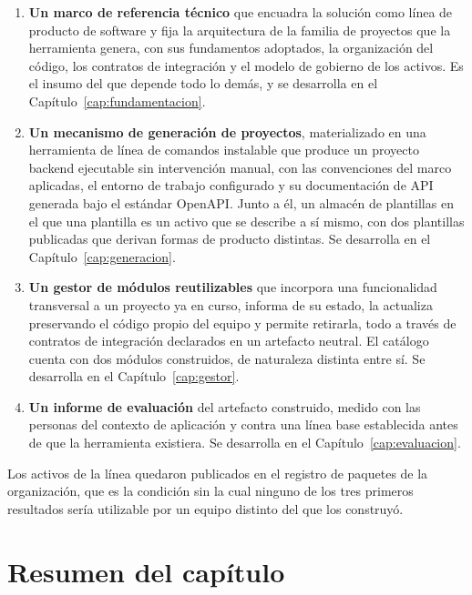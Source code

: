 \begin{enumerate}
\item \textbf{Un marco de referencia técnico} que encuadra la solución como
línea de producto de software y fija la arquitectura de la familia de
proyectos que la herramienta genera, con sus fundamentos adoptados, la
organización del código, los contratos de integración y el modelo de
gobierno de los activos. Es el insumo del que depende todo lo demás, y se
desarrolla en el Capítulo~\ref{cap:fundamentacion}.

\item \textbf{Un mecanismo de generación de proyectos}, materializado en una
herramienta de línea de comandos instalable que produce un proyecto backend
ejecutable sin intervención manual, con las convenciones del marco aplicadas,
el entorno de trabajo configurado y su documentación de API generada bajo el
estándar OpenAPI. Junto a él, un almacén de plantillas en el que una
plantilla es un activo que se describe a sí mismo, con dos plantillas
publicadas que derivan formas de producto distintas. Se desarrolla en el
Capítulo~\ref{cap:generacion}.

\item \textbf{Un gestor de módulos reutilizables} que incorpora una
funcionalidad transversal a un proyecto ya en curso, informa de su estado, la
actualiza preservando el código propio del equipo y permite retirarla, todo a
través de contratos de integración declarados en un artefacto neutral. El
catálogo cuenta con dos módulos construidos, de naturaleza distinta entre sí.
Se desarrolla en el Capítulo~\ref{cap:gestor}.

\item \textbf{Un informe de evaluación} del artefacto construido, medido con
las personas del contexto de aplicación y contra una línea base establecida
antes de que la herramienta existiera. Se desarrolla en el
Capítulo~\ref{cap:evaluacion}.
\end{enumerate}

Los activos de la línea quedaron publicados en el registro de paquetes de la
organización, que es la condición sin la cual ninguno de los tres primeros
resultados sería utilizable por un equipo distinto del que los construyó.



\section{Resumen del capítulo}

